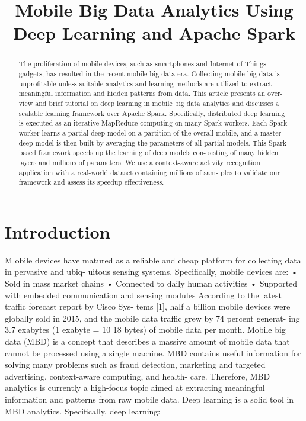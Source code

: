 \documentclass[14pt, a4paper]{extarticle}
\begin{document}
\title{Mobile Big Data Analytics
Using Deep Learning and Apache Spark}
\author{}
\date{}
\maketitle

\newpage

\tableofcontents

\newpage

\begin{abstract}
The proliferation of mobile devices, such as smartphones and Internet of Things
gadgets, has resulted in the recent mobile big data era. Collecting mobile big data
is unprofitable unless suitable analytics and learning methods are utilized to extract
meaningful information and hidden patterns from data. This article presents an over-
view and brief tutorial on deep learning in mobile big data analytics and discusses
a scalable learning framework over Apache Spark. Specifically, distributed deep
learning is executed as an iterative MapReduce computing on many Spark workers.
Each Spark worker learns a partial deep model on a partition of the overall mobile,
and a master deep model is then built by averaging the parameters of all partial
models. This Spark-based framework speeds up the learning of deep models con-
sisting of many hidden layers and millions of parameters. We use a context-aware
activity recognition application with a real-world dataset containing millions of sam-
ples to validate our framework and assess its speedup effectiveness.
\end{abstract}


\section{Introduction}

M
obile devices have matured as a reliable and cheap
platform for collecting data in pervasive and ubiq-
uitous sensing systems. Specifically, mobile devices are:
• Sold in mass market chains
• Connected to daily human activities
• Supported with embedded communication and sensing modules
According to the latest traffic forecast report by Cisco Sys-
tems [1], half a billion mobile devices were globally sold in
2015, and the mobile data traffic grew by 74 percent generat-
ing 3.7 exabytes (1 exabyte = 10 18 bytes) of mobile data per
month. Mobile big data (MBD) is a concept that describes
a massive amount of mobile data that cannot be processed
using a single machine. MBD contains useful information for
solving many problems such as fraud detection, marketing and
targeted advertising, context-aware computing, and health-
care. Therefore, MBD analytics is currently a high-focus topic
aimed at extracting meaningful information and patterns from
raw mobile data.
Deep learning is a solid tool in MBD analytics. Specifically,
deep learning:
\end{document}
